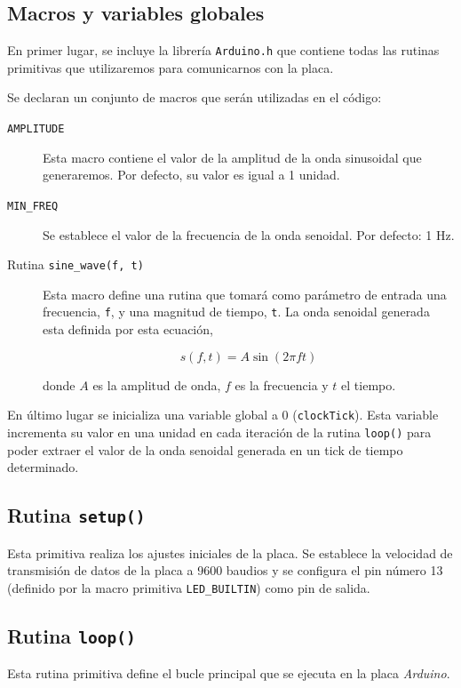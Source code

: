 \documentclass[10pt,a4paper]{report}
\begin{document}
	
	\subsection{Macros y variables globales}
	En primer lugar, se incluye la librería \texttt{Arduino.h} que contiene todas las rutinas primitivas que utilizaremos para comunicarnos con la placa.
	
	Se declaran un conjunto de macros que serán utilizadas en el código:
	\begin{description}
		\item[\texttt{AMPLITUDE}] Esta macro contiene el valor de la amplitud de la onda sinusoidal que generaremos. Por defecto, su valor es igual a 1 unidad.
		\item[\texttt{MIN\_FREQ}] Se establece el valor de la frecuencia de la onda senoidal. Por defecto: 1 Hz.
		\item[Rutina \texttt{sine\_wave(f, t)}] Esta macro define una rutina que tomará como parámetro de entrada una frecuencia, \texttt{f}, y una magnitud de tiempo, \texttt{t}. La onda senoidal generada esta definida por esta ecuación,
		
		\begin{equation*}
			s(f,t) = A \sin ( 2 \pi f t )
		\end{equation*}
		
		donde $A$ es la amplitud de onda, $f$ es la frecuencia y $t$ el tiempo.
	\end{description}
	
	En último lugar se inicializa una variable global a 0 (\texttt{clockTick}). Esta variable incrementa su valor en una unidad en cada iteración de la rutina \texttt{loop()} para poder extraer el valor de la onda senoidal generada en un tick de tiempo determinado. 
	
	
	
	\subsection{Rutina \texttt{setup()}}
	Esta primitiva realiza los ajustes iniciales de la placa. Se establece la velocidad de transmisión de datos de la placa a 9600 baudios y se configura el pin número 13 (definido por la macro primitiva \texttt{LED\_BUILTIN}) como pin de salida.
	
	
	
	\subsection{Rutina \texttt{loop()}}
	Esta rutina primitiva define el bucle principal que se ejecuta en la placa \textit{Arduino}. 
	
\end{document}
